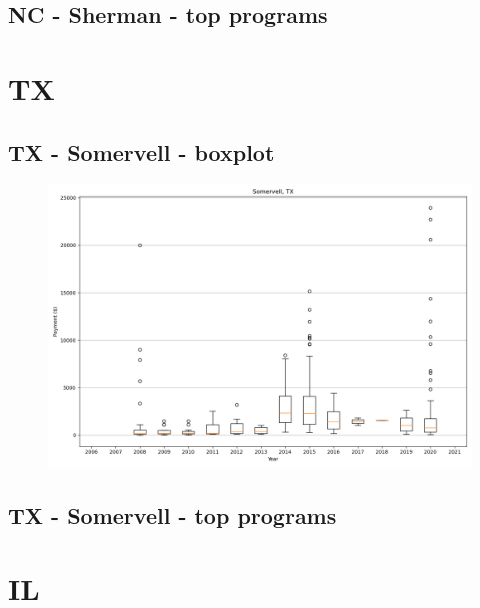 \subsection*{NC - Sherman - top programs}

\newpage
\section*{TX}
\subsection*{TX - Somervell - boxplot}
\begin{figure}[h]
\centering
\includegraphics[width=7in]{../output/boxplots/counties/Somervell-TX_boxplot.png}
\end{figure}


\subsection*{TX - Somervell - top programs}

\newpage
\section*{IL}
